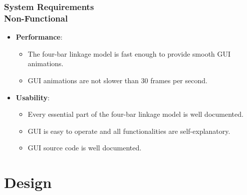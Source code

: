 \documentclass[ucs,10pt]{beamer}
\begin{document}
\begin{frame}
	\frametitle{System Requirements \\
		\small \color{rwth-blue} Non-Functional}
	\begin{itemize}
		\item \textbf{Performance}:
		\begin{itemize}
			\item The four-bar linkage model is fast enough to provide smooth GUI animations.
			\item GUI animations are not slower than 30 frames per second.
		\end{itemize}
		\item \textbf{Usability}:
		\begin{itemize}
			\item Every essential part of the four-bar linkage model is well documented.
			\item GUI is easy to operate and all functionalities are self-explanatory.
			\item GUI source code is well documented.
		\end{itemize}
	\end{itemize}
\end{frame}

\section{Design}
\end{document}
